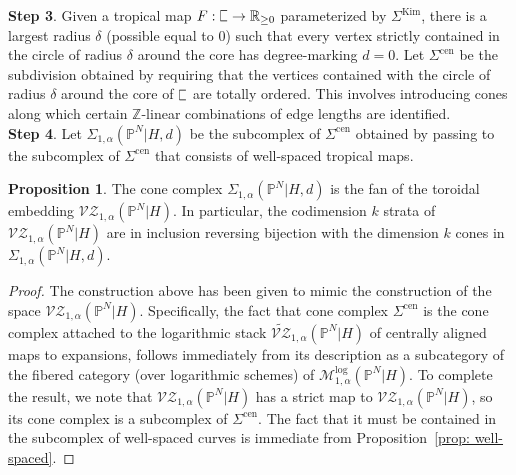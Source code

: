 \documentclass[11pt]{amsart}
\newcommand{\plC}{\scalebox{0.8}[1.3]{$\sqsubset$}}
\newcommand{\Z}{\mathbb{Z}}
\renewcommand{\to}{\rightarrow}
\theoremstyle{definition}
\newtheorem{prop}[thm]{Proposition}
\theoremstyle{definition}
\begin{document}
\noindent
\textbf{Step 3}. Given a tropical map $F: \plC\to \mathbb R_{\geq 0}$ parameterized by $\Sigma^{\mathrm{Kim}}$, there is a largest radius $\delta$ (possible equal to $0$) such that every vertex strictly contained in the circle of radius $\delta$ around the core has degree-marking $d=0$. Let $
\Sigma^{\mathrm{cen}}$ be the subdivision obtained by requiring that the vertices contained with the circle of radius $\delta$ around the core of $\plC$ are totally ordered. This involves introducing cones along which certain $\Z$-linear combinations of edge lengths are identified.\\

\noindent
\textbf{Step 4}. Let $
\Sigma_{1,\alpha}(\mathbb P^N|H,d)$ be the subcomplex of $\Sigma^{\mathrm{cen}}$ obtained by passing to the subcomplex of $\Sigma^{\mathrm{cen}}$ that consists of well-spaced tropical maps.

\begin{prop}
The cone complex $
\Sigma_{1,\alpha}(\mathbb P^N|H,d)$ is the fan of the toroidal embedding $
\mathcal{VZ}_{1,\alpha}(\mathbb P^N|H)$. In particular, the codimension $k$ strata of $
\mathcal{VZ}_{1,\alpha}(\mathbb P^N|H)$ are in inclusion reversing bijection with the dimension $k$ cones in $
\Sigma_{1,\alpha}(\mathbb P^N|H,d)$.
\end{prop}

\begin{proof}
The construction above has been given to mimic the construction of the space $
\mathcal{VZ}_{1,\alpha}(\mathbb P^N|H)$. Specifically, the fact that cone complex $\Sigma^{\mathrm{cen}}$ is the cone complex attached to the logarithmic stack $\widetilde{\mathcal{VZ}}_{1,\alpha}(\mathbb P^N|H)$ of centrally aligned maps to expansions, follows immediately from its description as a subcategory of the fibered category (over logarithmic schemes) of $\mathcal M^{\mathrm{log}}_{1,\alpha}(\mathbb P^N|H)$. To complete the result, we note that $
\mathcal{VZ}_{1,\alpha}(\mathbb P^N|H)$ has a strict map to $
\mathcal{VZ}_{1,\alpha}(\mathbb P^N|H)$, so its cone complex is a subcomplex of $\Sigma^{\mathrm{cen}}$. The fact that it must be contained in the subcomplex of well-spaced curves is immediate from Proposition~\ref{prop: well-spaced}.
\end{proof}
\end{document}
